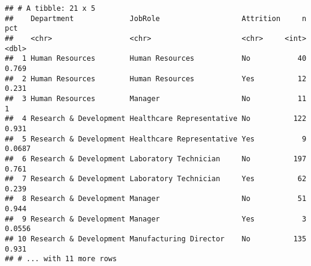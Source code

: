 \documentclass[
]{article}
\newenvironment{Shaded}{\begin{snugshade}}{\end{snugshade}}
\newcommand{\KeywordTok}[1]{\textcolor[rgb]{0.13,0.29,0.53}{\textbf{#1}}}
\newcommand{\NormalTok}[1]{#1}
\newcommand{\OperatorTok}[1]{\textcolor[rgb]{0.81,0.36,0.00}{\textbf{#1}}}
\newcommand{\StringTok}[1]{\textcolor[rgb]{0.31,0.60,0.02}{#1}}
\begin{document}
\begin{Shaded}
\end{Shaded}

\begin{verbatim}
## # A tibble: 21 x 5
##    Department             JobRole                   Attrition     n    pct
##    <chr>                  <chr>                     <chr>     <int>  <dbl>
##  1 Human Resources        Human Resources           No           40 0.769 
##  2 Human Resources        Human Resources           Yes          12 0.231 
##  3 Human Resources        Manager                   No           11 1     
##  4 Research & Development Healthcare Representative No          122 0.931 
##  5 Research & Development Healthcare Representative Yes           9 0.0687
##  6 Research & Development Laboratory Technician     No          197 0.761 
##  7 Research & Development Laboratory Technician     Yes          62 0.239 
##  8 Research & Development Manager                   No           51 0.944 
##  9 Research & Development Manager                   Yes           3 0.0556
## 10 Research & Development Manufacturing Director    No          135 0.931 
## # ... with 11 more rows
\end{verbatim}
\end{document}
